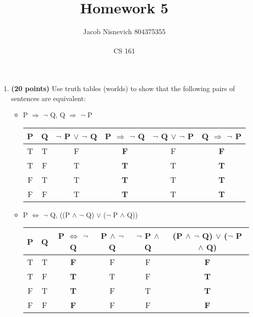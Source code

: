 \documentclass[12pt]{article}
\begin{document}
 
\title{Homework 5}
\author{Jacob Nisnevich \textemdash \hspace{2px} 804375355 \\ \\
CS 161}
 
\maketitle
 
\begin{enumerate}
	\renewcommand\labelenumi{\bfseries\theenumi.}
	\item \textbf{(20 points)} Use truth tables (worlds) to show that the following pairs of sentences are equivalent: 

	\begin{itemize}
		\item P $\Rightarrow$ $\neg$ Q, Q $\Rightarrow$ $\neg$ P

		\begin{table}[!ht]
			\centering
			\begin{tabular}{| c | c || c | c | c | c |}
				\hline
				P & Q & $\neg$ P $\lor$ $\neg$ Q & \textbf{P $\Rightarrow$ $\neg$ Q} & $\neg$ Q $\lor$ $\neg$ P & \textbf{Q $\Rightarrow$ $\neg$ P} \\
				\hline
				T & T & F & \textbf{F} & F & \textbf{F} \\
				T & F & T & \textbf{T} & T & \textbf{T} \\
				F & T & T & \textbf{T} & T & \textbf{T} \\
				F & F & T & \textbf{T} & T & \textbf{T} \\
				\hline
			\end{tabular}
		\end{table}

		\item P $\Leftrightarrow$ $\neg$ Q, ((P $\land$ $\neg$ Q) $\lor$ ($\neg$ P $\land$ Q))

		\begin{table}[!ht]
			\centering
			\begin{tabular}{| c | c || c | c | c | c |}
				\hline
				P & Q & \textbf{P $\Leftrightarrow$ $\neg$ Q} & P $\land$ $\neg$ Q & $\neg$ P $\land$ Q & \textbf{(P $\land$ $\neg$ Q) $\lor$ ($\neg$ P $\land$ Q)} \\
				\hline
				T & T & \textbf{F} & F & F & \textbf{F} \\
				T & F & \textbf{T} & T & F & \textbf{T} \\
				F & T & \textbf{T} & F & T & \textbf{T} \\
				F & F & \textbf{F} & F & F & \textbf{F} \\
				\hline
			\end{tabular}
		\end{table}
	\end{itemize}


\end{enumerate}
\end{document}
